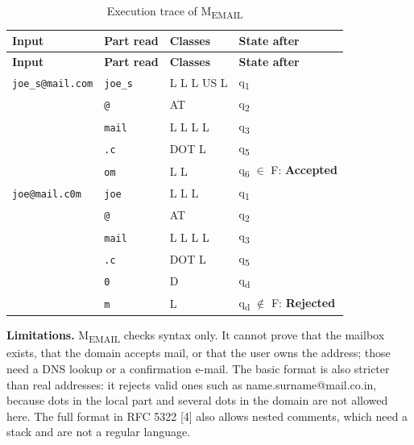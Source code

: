 \documentclass[12pt,a4paper]{article}
\begin{document}
{\small
\begin{longtable}{|>{\raggedright\arraybackslash}p{}|>{\raggedright\arraybackslash}p{}|>{\raggedright\arraybackslash}p{}|>{\raggedright\arraybackslash}p{}|}
\caption[Execution trace of MEMAIL]{Execution trace of M\textsubscript{EMAIL}}\label{tab:em_trace}\\
\hline
\rowcolor{hdr}\textbf{Input} & \textbf{Part read} & \textbf{Classes} & \textbf{State after}\\ \hline
\endfirsthead
\hline
\rowcolor{hdr}\textbf{Input} & \textbf{Part read} & \textbf{Classes} & \textbf{State after}\\ \hline
\endhead
\texttt{joe\_s@mail.com} & \texttt{joe\_s} & L L L US L & q\textsubscript{1}\\ \hline
 & \texttt{@} & AT & q\textsubscript{2}\\ \hline
 & \texttt{mail} & L L L L & q\textsubscript{3}\\ \hline
 & \texttt{.c} & DOT L & q\textsubscript{5}\\ \hline
 & \texttt{om} & L L & q\textsubscript{6} \ensuremath{\in} F: \textbf{Accepted}\\ \hline
\texttt{joe@mail.c0m} & \texttt{joe} & L L L & q\textsubscript{1}\\ \hline
 & \texttt{@} & AT & q\textsubscript{2}\\ \hline
 & \texttt{mail} & L L L L & q\textsubscript{3}\\ \hline
 & \texttt{.c} & DOT L & q\textsubscript{5}\\ \hline
 & \texttt{0} & D & q\textsubscript{d}\\ \hline
 & \texttt{m} & L & q\textsubscript{d} \ensuremath{\notin} F: \textbf{Rejected}\\ \hline
\end{longtable}}

\textbf{Limitations.} M\textsubscript{EMAIL} checks syntax only. It cannot prove that the mailbox exists, that the domain accepts mail, or that the user owns the address; those need a DNS lookup or a confirmation e-mail. The basic format is also stricter than real addresses: it rejects valid ones such as name.surname@mail.co.in, because dots in the local part and several dots in the domain are not allowed here. The full format in RFC 5322 [4] also allows nested comments, which need a stack and are not a regular language.
\end{document}
